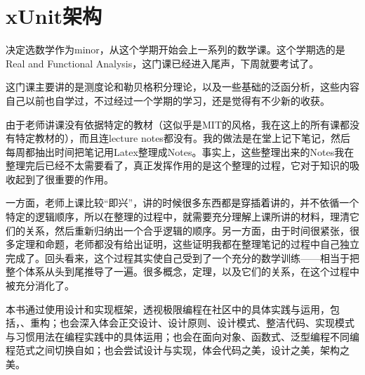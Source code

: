\begin{savequote}[45mm]
\end{savequote}

\chapter{xUnit架构} 
\label{ch:xunit-architecture}

\begin{content}

\begin{tcolorbox}[enhanced jigsaw,breakable,pad at break*=1mm,
  colback=red!5!white,colframe=red!75!black,fonttitle=\bfseries,
  colbacktitle=red!75!black,enhanced, attach boxed title to top center={yshift=-2mm},
  title=架构之美架构之美架构之美架构之美架构之美， Hello, World,
  watermark color=white,watermark text=\Roman{tcbbreakpart}]

\begin{content}

决定选数学作为minor，从这个学期开始会上一系列的数学课。这个学期选的是Real and Functional Analysis，这门课已经进入尾声，下周就要考试了。
 
这门课主要讲的是测度论和勒贝格积分理论，以及一些基础的泛函分析，这些内容自己以前也自学过，不过经过一个学期的学习，还是觉得有不少新的收获。
 
由于老师讲课没有依据特定的教材（这似乎是MIT的风格，我在这上的所有课都没有特定教材的），而且连lecture notes都没有。我的做法是在堂上记下笔记，然后每周都抽出时间把笔记用Latex整理成Notes。事实上，这些整理出来的Notes我在整理完后已经不太需要看了，真正发挥作用的是这个整理的过程，它对于知识的吸收起到了很重要的作用。
 
一方面，老师上课比较“即兴”，讲的时候很多东西都是穿插着讲的，并不依循一个特定的逻辑顺序，所以在整理的过程中，就需要充分理解上课所讲的材料，理清它们的关系，然后重新归纳出一个合乎逻辑的顺序。另一方面，由于时间很紧张，很多定理和命题，老师都没有给出证明，这些证明我都在整理笔记的过程中自己独立完成了。回头看来，这个过程其实使自己受到了一个充分的数学训练——相当于把整个体系从头到尾推导了一遍。很多概念，定理，以及它们的关系，在这个过程中被充分消化了。



\end{content}

\end{tcolorbox}

本书通过使用\cpp{}设计和实现框架，透视极限编程在\cpp{}社区中的具体实践与运用，包括，、重构；也会深入体会正交设计、设计原则、设计模式、整洁代码、实现模式与习惯用法在编程实践中的具体运用；也会在面向对象、函数式、泛型编程不同编程范式之间切换自如；也会尝试设计与实现，体会代码之美，设计之美，架构之美。

\end{content}

